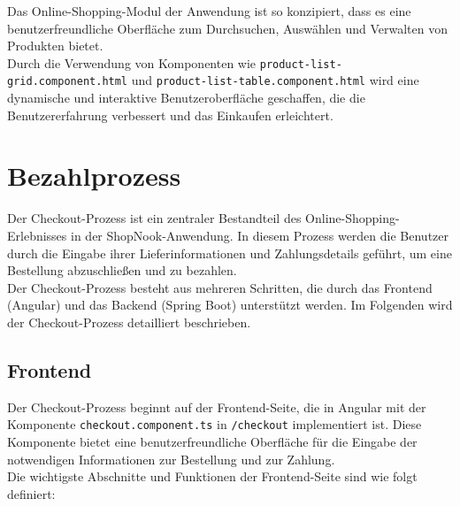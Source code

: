 Das Online-Shopping-Modul der Anwendung ist so konzipiert, dass es eine benutzerfreundliche Oberfläche zum Durchsuchen, Auswählen und Verwalten von Produkten bietet. \\
Durch die Verwendung von Komponenten wie \verb*|product-list-grid.component.html| und \verb*|product-list-table.component.html| wird eine dynamische und interaktive Benutzeroberfläche geschaffen, die die Benutzererfahrung verbessert und das Einkaufen erleichtert.

\section{Bezahlprozess}

Der Checkout-Prozess ist ein zentraler Bestandteil des Online-Shopping-Erlebnisses in der ShopNook-Anwendung. In diesem Prozess werden die Benutzer durch die Eingabe ihrer Lieferinformationen und Zahlungsdetails geführt, um eine Bestellung abzuschließen und zu bezahlen. \\
Der Checkout-Prozess besteht aus mehreren Schritten, die durch das Frontend (Angular) und das Backend (Spring Boot) unterstützt werden. Im Folgenden wird der Checkout-Prozess detailliert beschrieben.

\subsection{Frontend}

Der Checkout-Prozess beginnt auf der Frontend-Seite, die in Angular mit der Komponente \verb*|checkout.component.ts| in \verb*|/checkout| implementiert ist. Diese Komponente bietet eine benutzerfreundliche Oberfläche für die Eingabe der notwendigen Informationen zur Bestellung und zur Zahlung.\\
Die wichtigste Abschnitte und Funktionen der Frontend-Seite sind wie folgt definiert:

